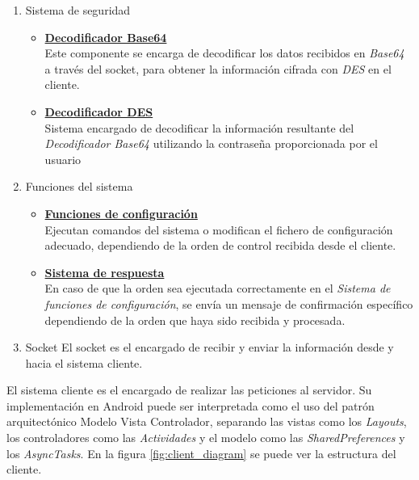 \documentclass[12pt]{article}
\begin{document}
            \begin{enumerate}
                \item Sistema de seguridad
                    \begin{itemize}
                        \item \textbf{\underline{Decodificador Base64}} \\
                            Este componente se encarga de decodificar los datos recibidos en \textit{Base64} a través del socket, para obtener la información cifrada con \textit{DES} en el cliente.
                        \item \textbf{\underline{Decodificador DES}} \\ 
                            Sistema encargado de decodificar la información resultante del \textit{Decodificador Base64} utilizando la contraseña proporcionada por el usuario
                    \end{itemize}
                \item Funciones del sistema
                    \begin{itemize}
                        \item \textbf{\underline{Funciones de configuración}} \\ 
                            Ejecutan comandos del sistema o modifican el fichero de configuración adecuado, dependiendo de la orden de control recibida desde el cliente.
                        \item \textbf{\underline{Sistema de respuesta}} \\
                            En caso de que la orden sea ejecutada correctamente en el \textit{Sistema de funciones de configuración}, se envía un mensaje de confirmación específico dependiendo de la orden que haya sido recibida y procesada.
                    \end{itemize}
                \item Socket
                    El socket es el encargado de recibir y enviar la información desde y hacia el sistema cliente.
            \end{enumerate}

            El sistema cliente es el encargado de realizar las peticiones al servidor. Su implementación en Android puede ser interpretada como el uso del patrón arquitectónico Modelo Vista Controlador, separando las vistas como los \textit{Layouts}, los controladores como las \textit{Actividades} y el modelo como las \textit{SharedPreferences} y los \textit{AsyncTasks}. En la figura \ref{fig:client_diagram} se puede ver la estructura del cliente.
\end{document}
